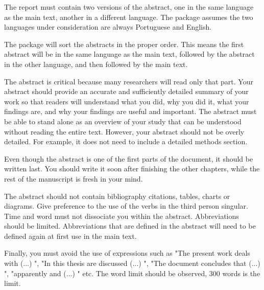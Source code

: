 \abstractEN %

The report must contain two versions of the abstract, one in the same language as the main text, another in a different language.  The package assumes the two languages under consideration are always Portuguese and English.

The package will sort the abstracts in the proper order. This means the first abstract will be in the same language as the main text, followed by the abstract in the other language, and then followed by the main text. 

The abstract is critical because many researchers will read only that part. Your abstract should provide an accurate and sufficiently detailed summary of your work so that readers will understand what you did, why you did it, what your findings are, and why your findings are useful and important. The abstract must be able to stand alone as an overview of your study that can be understood without reading the entire text. However, your abstract should not be overly detailed. For example, it does not need to include a detailed methods section.

Even though the abstract is one of the first parts of the document, it should be written last. You should write it soon after finishing the other chapters, while the rest of the manuscript is fresh in your mind. 

The abstract should not contain bibliography citations, tables, charts or diagrams. Give preference to the use of the verbs in the third person singular. Time and word must not dissociate you within the abstract. Abbreviations should be limited. Abbreviations that are defined in the abstract will need to be defined again at first use in the main text. 

Finally, you must avoid the use of expressions such as "The present work deals with (...) ", "In this thesis are discussed (...) ", "The document concludes that (...) ", "apparently and (...) " etc.
The word limit should be observed, 300 words is the limit.

